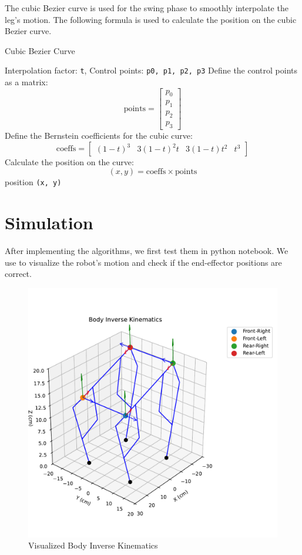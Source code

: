 \documentclass[a4paper,11pt]{article}
\begin{document}
The cubic Bezier curve is used for the swing phase to smoothly interpolate the leg's motion. The following formula is used to calculate the position on the cubic Bezier curve.

\begin{algorithm}[H]
	\caption{Cubic Bezier Curve}
	\begin{algorithmic}[1]
		\Require Interpolation factor: \texttt{t}, Control points: \texttt{p0, p1, p2, p3}
		\State Define the control points as a matrix:
		$$
			\text{points} = \begin{bmatrix} p_0 \\ p_1 \\ p_2 \\ p_3 \end{bmatrix}
		$$
		\State Define the Bernstein coefficients for the cubic curve:
		$$
			\text{coeffs} = \begin{bmatrix} (1-t)^3 & 3(1-t)^2t & 3(1-t)t^2 & t^3 \end{bmatrix}
		$$
		\State Calculate the position on the curve:
		$$
			(x, y) = \text{coeffs} \times \text{points}
		$$
		\State \Return position \texttt{(x, y)}
	\end{algorithmic}
\end{algorithm}

\section*{Simulation}

After implementing the algorithms, we first test them in python notebook.
We use  to visualize the robot's motion and check if the end-effector positions are correct.

\begin{figure}[H]
  \centering
	\includegraphics[width=0.55\linewidth]{../../assets/body_inverse_kinematics.pdf}
  \caption{Visualized Body Inverse Kinematics}
  \label{fig:body}
\end{figure}
\end{document}
